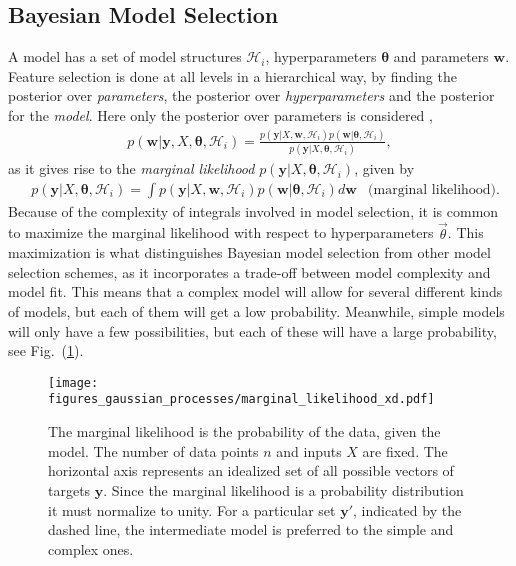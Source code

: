 \documentclass[twoside,english]{uiofysmaster}
\begin{document}
\subsection{Bayesian Model Selection}

A model has a set of model structures $\mathcal{H}_i$, hyperparameters $\boldsymbol{\theta}$ and parameters $\textbf{w}$. Feature selection is done at all levels in a hierarchical way, by finding the  posterior over \textit{parameters}, the posterior over \textit{hyperparameters} and the posterior for the \textit{model}. Here only the posterior over parameters is considered \cite{rasmussen2006gaussian},
\begin{align}
p(\textbf{w}| \textbf{y}, X, \boldsymbol{\theta}, \mathcal{H}_i) = \frac{p(\textbf{y} | X, \textbf{w}, \mathcal{H}_i) p(\textbf{w}|\boldsymbol{\theta}, \mathcal{H}_i)}{p(\textbf{y}|X, \boldsymbol{\theta}, \mathcal{H}_i)},
\end{align}
as it gives rise to the \textit{marginal likelihood} $p(\textbf{y}|X, \boldsymbol{\theta}, \mathcal{H}_i)$, given by 
\begin{align}
&p(\textbf{y}|X, \boldsymbol{\theta}, \mathcal{H}_i) = \int p(\textbf{y} | X, \textbf{w}, \mathcal{H}_i)p(\textbf{w}| \boldsymbol{\theta}, \mathcal{H}_i) d \textbf{w} & \text{(marginal likelihood)}.
\end{align}
Because of the complexity of integrals involved in model selection, it is common to maximize the marginal likelihood with respect to hyperparameters $\vec{\theta}$. This maximization is what distinguishes Bayesian model selection from other model selection schemes, as it incorporates a trade-off between model complexity and model fit. This means that a complex model will allow for several different kinds of models, but each of them will get a low probability. Meanwhile, simple models will only have a few possibilities, but each of these will have a large probability, see Fig.\ (\ref{Fig:: gaussian process : Marginal likelihood Rasmussen}).

\begin{figure}
\centering
\texttt{[image: figures\_gaussian\_processes/marginal\_likelihood\_xd.pdf]}
\caption{The marginal likelihood is the probability of the data, given the model. The number of data points $n$ and inputs $X$ are fixed. The horizontal axis represents an idealized set of all possible vectors of targets $\textbf{y}$. Since the marginal likelihood is a probability distribution it must normalize to unity. For a particular set $\textbf{y}'$, indicated by the dashed line, the intermediate model is preferred to the simple and complex ones.}
\label{Fig:: gaussian process : Marginal likelihood Rasmussen}
\end{figure}
\end{document}
